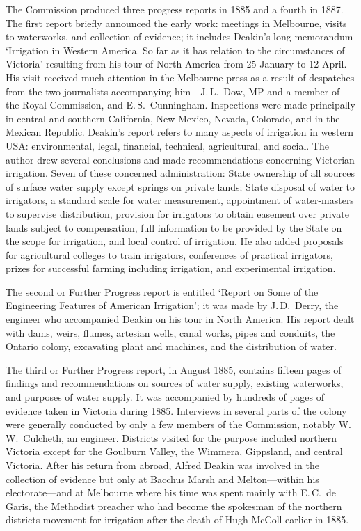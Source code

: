 The Commission produced three progress reports in 1885 and a fourth in
1887.  The first report briefly announced the early work: meetings in
Melbourne, visits to waterworks, and collection of evidence; it
includes Deakin's long memorandum `Irrigation in Western America. So
far as it has relation to the circumstances of Victoria' resulting
from his tour of North America from 25 January to 12 April.  His visit
received much attention in the Melbourne press as a result of
despatches from the two journalists accompanying him---J.\,L.~Dow, MP
and a member of the Royal Commission, and E.\,S.~Cunningham.
Inspections were made principally in central and southern California,
New Mexico, Nevada, Colorado, and in the Mexican Republic.  Deakin's
report refers to many aspects of irrigation in western USA:
environmental, legal, financial, technical, agricultural, and social.
The author drew several conclusions and made recommendations
concerning Victorian irrigation.  Seven of these concerned
administration: State ownership of all sources of surface water supply
except springs on private lands; State disposal of water to
irrigators, a standard scale for water measurement, appointment of
water-masters to supervise distribution, provision for irrigators to
obtain easement over private lands subject to compensation, full
information to be provided by the State on the scope for irrigation,
and local control of irrigation.  He also added proposals for
agricultural colleges to train irrigators, conferences of practical
irrigators, prizes for successful farming including irrigation, and
experimental irrigation.

The second or Further Progress report is entitled `Report on Some of
the Engineering Features of American Irrigation'; it was made by
J.\,D.~Derry, the engineer who accompanied Deakin on his tour in North
America.  His report dealt with dams, weirs, flumes, artesian wells,
canal works, pipes and conduits, the Ontario colony, excavating plant
and machines, and the distribution of water.

The third or Further Progress report, in August 1885, contains fifteen
pages of findings and recommendations on sources of water supply,
existing waterworks, and purposes of water supply.  It was accompanied
by hundreds of pages of evidence taken in Victoria during 1885.
Interviews in several parts of the colony were generally conducted by
only a few members of the Commission, notably W.\,W.~Culcheth, an
engineer.  Districts visited for the purpose included northern
Victoria except for the Goulburn Valley, the Wimmera, Gippsland, and
central Victoria.  After his return from abroad, Alfred Deakin was
involved in the collection of evidence but only at Bacchus Marsh and
Melton---within his electorate---and at Melbourne where his time was
spent mainly with E.\,C.~de Garis, the Methodist preacher who had
become the spokesman of the northern districts movement for irrigation
after the death of Hugh McColl earlier in 1885.

